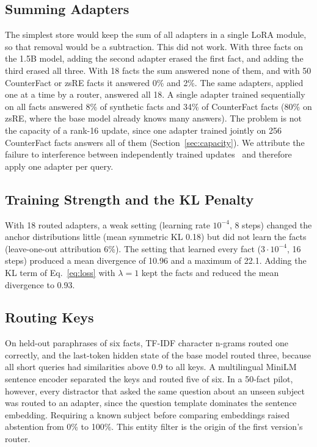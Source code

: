 \documentclass[journal,10pt]{IEEEtran}
\begin{document}


\subsection{Summing Adapters}
The simplest store would keep the sum of all adapters in a single LoRA module, so that
removal would be a subtraction. This did not work. With three facts on the 1.5B model,
adding the second adapter erased the first fact, and adding the third erased all three.
With 18 facts the sum answered none of them, and with 50 CounterFact or zsRE facts it
answered 0\% and 2\%. The same adapters, applied one at a time by a router, answered all
18. A single adapter trained sequentially on all facts answered 8\% of synthetic facts
and 34\% of CounterFact facts (80\% on zsRE, where the base model already knows many
answers). The problem is not the capacity of a rank-16 update, since one adapter trained
jointly on 256 CounterFact facts answers all of them (Section~\ref{sec:capacity}). We
attribute the failure to interference between independently trained
updates~\cite{ilharco2023taskarithmetic,yadav2023ties} and therefore apply one adapter
per query.

\subsection{Training Strength and the KL Penalty}
With 18 routed adapters, a weak setting (learning rate $10^{-4}$, 8 steps) changed the
anchor distributions little (mean symmetric KL 0.18) but did not learn the facts
(leave-one-out attribution 6\%). The setting that learned every fact ($3\cdot10^{-4}$,
16 steps) produced a mean divergence of 10.96 and a maximum of 22.1. Adding the KL term
of Eq.~\eqref{eq:loss} with $\lambda=1$ kept the facts and reduced the mean divergence to
0.93.

\subsection{Routing Keys}
On held-out paraphrases of six facts, TF-IDF character n-grams routed one correctly, and
the last-token hidden state of the base model routed three, because all short queries
had similarities above 0.9 to all keys. A multilingual MiniLM sentence encoder separated
the keys and routed five of six. In a 50-fact pilot, however, every distractor that asked
the same question about an unseen subject was routed to an adapter, since the question
template dominates the sentence embedding. Requiring a known subject before comparing
embeddings raised abstention from 0\% to 100\%. This entity filter is the origin of the
first version's router.
\end{document}
